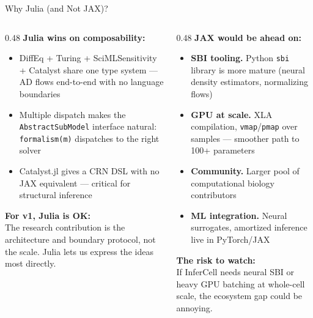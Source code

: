 \documentclass[aspectratio=169]{beamer}
\begin{document}
\begin{frame}[noframenumbering]{Why Julia (and Not JAX)?}
	\small
	\begin{columns}[T]
		\begin{column}{0.48\textwidth}
			\textbf{Julia wins on composability:}
			\scriptsize
			\begin{itemize}\itemsep3pt
				\item DiffEq + Turing + SciMLSensitivity + Catalyst share one type system --- AD flows end-to-end with no language boundaries
				\item Multiple dispatch makes the \texttt{AbstractSubModel} interface natural: \texttt{formalism(m)} dispatches to the right solver
				\item Catalyst.jl gives a CRN DSL with no JAX equivalent --- critical for structural inference
			\end{itemize}

			\textbf{For v1, Julia is OK:}\\
			{\scriptsize The research contribution is the architecture and boundary protocol, not the scale. Julia lets us express the ideas most directly.}
		\end{column}
		\begin{column}{0.48\textwidth}
			\textbf{JAX would be ahead on:}
			\scriptsize
			\begin{itemize}\itemsep3pt
				\item \textbf{SBI tooling.} Python \texttt{sbi} library is more mature (neural density estimators, normalizing flows)
				\item \textbf{GPU at scale.} XLA compilation, \texttt{vmap}/\texttt{pmap} over samples --- smoother path to 100+ parameters
				\item \textbf{Community.} Larger pool of computational biology contributors
				\item \textbf{ML integration.} Neural surrogates, amortized inference live in PyTorch/JAX
			\end{itemize}

			\medskip
			\textbf{The risk to watch:}\\
			{\scriptsize If InferCell needs neural SBI or heavy GPU batching at whole-cell scale, the ecosystem gap could be annoying.}
		\end{column}
	\end{columns}
\end{frame}


\end{document}

